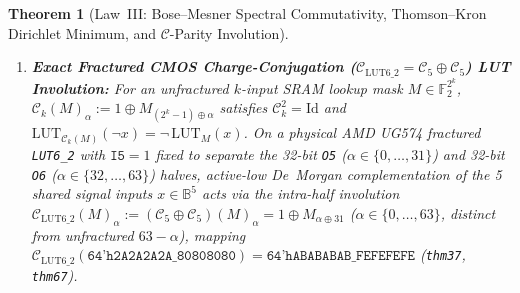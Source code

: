 \documentclass[11pt,letterpaper]{article}
\theoremstyle{spectralthm}
\newtheorem{theorem}{Theorem}[section]
\begin{document}
\begin{theorem}[Law~III: Bose--Mesner Spectral Commutativity, Thomson--Kron Dirichlet Minimum, and $\mathcal{C}$-Parity Involution]
\begin{enumerate}
\begin{equation}
\end{equation}
where $S_\Gamma := L_{BB} - L_{BI} L_{II}^{-1} L_{IB}$ is the Kron Schur-complement (Dirichlet-to-Neumann) operator~\cite{kron1939tensor}; hence harmonic equilibrium achieves $\min_{\phi_I} \mathcal{E}(\Delta B, \phi_I) = \frac{1}{2}\Delta B^\top S_\Gamma \Delta B$, which vanishes identically ($\mathcal{E} = 0$) whenever Stage~2 clamps $\Delta B = \mathbf{0}$.
\item \textbf{Exact Fractured CMOS Charge-Conjugation ($\mathcal{C}_{\mathrm{LUT6\_2}} = \mathcal{C}_5 \oplus \mathcal{C}_5$) LUT Involution:} For an unfractured $k$-input SRAM lookup mask $M \in \mathbb{F}_2^{2^k}$, $\mathcal{C}_k(M)_\alpha := 1 \oplus M_{(2^k-1)\oplus\alpha}$ satisfies $\mathcal{C}_k^2 = \mathrm{Id}$ and $\mathrm{LUT}_{\mathcal{C}_k(M)}(\neg x) = \neg\,\mathrm{LUT}_M(x)$. On a physical AMD UG574 fractured \mbox{\texttt{LUT6\_2}} with $\texttt{I5} = 1$ fixed to separate the 32-bit \texttt{O5} ($\alpha \in \{0,\dots,31\}$) and 32-bit \texttt{O6} ($\alpha \in \{32,\dots,63\}$) halves, active-low De~Morgan complementation of the 5 shared signal inputs $x \in \mathbb{B}^5$ acts via the intra-half involution $\mathcal{C}_{\mathrm{LUT6\_2}}(M)_\alpha := (\mathcal{C}_5 \oplus \mathcal{C}_5)(M)_\alpha = 1 \oplus M_{\alpha \oplus 31}$ ($\alpha \in \{0,\dots,63\}$, distinct from unfractured $63 - \alpha$), mapping $\mathcal{C}_{\mathrm{LUT6\_2}}(\texttt{64'h2A2A2A2A\_80808080}) = \texttt{64'hABABABAB\_FEFEFEFE}$ (\texttt{thm37}, \texttt{thm67}).
\end{enumerate}
\end{theorem}
\end{document}
